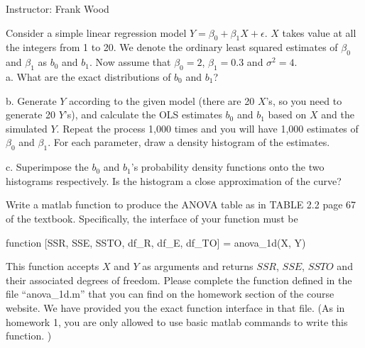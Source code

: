 \documentclass[12pt]{article}
\begin{document}
 \begin{center}
  Instructor: Frank Wood
 \end{center}
{}
\finishfirstpage



 {
  Consider a simple linear regression model $Y=\beta_0+\beta_1X+\epsilon$. $X$ takes value at all the integers from 1 to 20. We denote the ordinary least squared estimates of $\beta_0$ and $\beta_1$ as $b_0$ and $b_1$. Now assume that $\beta_0=2$, $\beta_1=0.3$ and $\sigma^2=4$.\\

 a. What are the exact distributions of $b_0$ and $b_1$?

 b. Generate $Y$ according to the given model (there are 20 $X$'s, so you need to generate 20 $Y$'s), and calculate the OLS estimates $b_0$ and $b_1$ based on $X$ and the simulated $Y$. Repeat the process 1,000 times and you will have 1,000 estimates of $\beta_0$ and $\beta_1$. For each parameter, draw a density histogram of the estimates.

 c. Superimpose the $b_0$ and $b_1$'s probability density functions onto the two histograms respectively. Is the histogram a
 close approximation of the curve?
   }
 { \vfill
  \answer
} { }

 {
Write a matlab function to produce the ANOVA table as in TABLE 2.2 page 67 of the textbook. Specifically, the interface of your function must be

\begin{center}                function [SSR, SSE, SSTO, df\_R, df\_E, df\_TO] = anova\_1d(X, Y)
\end{center}

This function accepts $X$ and $Y$ as arguments and returns $SSR$, $SSE$, $SSTO$ and their associated degrees of freedom. Please complete the function defined in the file ``anova\_1d.m'' that you can find on the homework section of the course website. We have provided you the exact function interface in that file. (As in homework 1, you are only allowed to use basic matlab commands to write this function. )

  }
 { \vfill
  \answer
} { }
\end{document}
